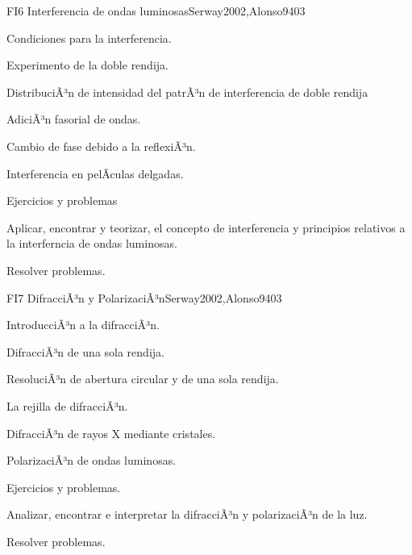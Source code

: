 \begin{syllabus}
\begin{unit}{FI6 Interferencia de ondas luminosas}{Serway2002,Alonso94}{0}{3}
\begin{topics}
      \item Condiciones para la interferencia.
        \item Experimento de la doble rendija.
        \item DistribuciÃ³n de intensidad del patrÃ³n
              de interferencia de doble rendija
        \item AdiciÃ³n fasorial de ondas.
        \item Cambio de fase debido a la reflexiÃ³n.
        \item Interferencia en pelÃ­culas delgadas.
        \item Ejercicios y problemas
   \end{topics}
   \begin{unitgoals}
      \item Aplicar, encontrar y teorizar, el concepto de interferencia y
            principios relativos a la interferncia de ondas luminosas.
      \item Resolver problemas.
   \end{unitgoals}
\end{unit}

\begin{unit}{FI7 DifracciÃ³n y PolarizaciÃ³n}{Serway2002,Alonso94}{0}{3}
\begin{topics}
      \item IntroducciÃ³n a la difracciÃ³n.
      \item DifracciÃ³n de una sola rendija.
      \item ResoluciÃ³n de abertura circular y de una sola rendija.
      \item La rejilla de difracciÃ³n.
      \item DifracciÃ³n de rayos X mediante cristales.
      \item PolarizaciÃ³n de ondas luminosas.
      \item Ejercicios y problemas.
   \end{topics}

   \begin{unitgoals}
      \item Analizar, encontrar e interpretar la difracciÃ³n y polarizaciÃ³n de la luz.
      \item Resolver problemas.
   \end{unitgoals}
\end{unit}



\begin{coursebibliography}
\end{coursebibliography}

\end{syllabus}
